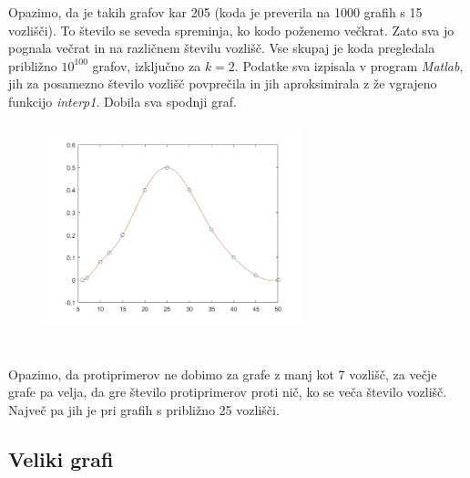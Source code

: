 \documentclass[a4paper]{article}
\begin{document}
Opazimo, da je takih grafov kar 205 (koda je preverila na 1000 grafih s 15 vozlišči). To število se seveda spreminja, ko kodo poženemo večkrat. Zato sva jo pognala večrat in na različnem številu vozlišč. Vse skupaj je koda pregledala približno $10^{100}$ grafov, izključno za $k = 2$. Podatke sva izpisala v program \textit{Matlab}, jih za posamezno število vozlišč povprečila in jih aproksimirala z že vgrajeno funkcijo \textit{interp1}. Dobila sva spodnji graf.
\begin{figure}[h!]
    \centering
    \includegraphics[width=7.5cm, height=6cm]{Slika3}
    \label{fig:mesh1}
\end{figure}\\
Opazimo, da protiprimerov ne dobimo za grafe z manj kot 7 vozlišč, za večje grafe pa velja, da gre število protiprimerov proti nič, ko se veča število vozlišč. Največ pa jih je pri grafih s približno 25 vozlišči.
\pagebreak

\subsection{Veliki grafi}
\end{document}
